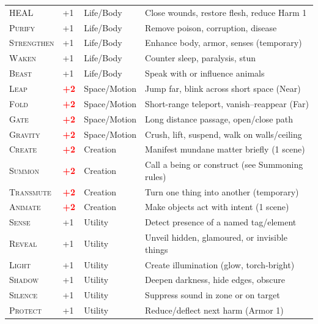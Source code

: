 \documentclass[10pt,a5paper]{book}
\newcommand{\dangerous}[1]{\textcolor{red}{\textbf{#1}}}
\newcommand{\tag}[1]{\textsc{#1}}
\begin{document}
\begin{longtable}{@{} p{2.5cm} p{1.2cm} p{2.5cm} p{6cm} @{}}
\tag{HEAL} & +1 & Life/Body & Close wounds, restore flesh, reduce Harm 1 \\
\tag{Purify} & +1 & Life/Body & Remove poison, corruption, disease \\
\tag{Strengthen} & +1 & Life/Body & Enhance body, armor, senses (temporary) \\
\tag{Waken} & +1 & Life/Body & Counter sleep, paralysis, stun \\
\tag{Beast} & +1 & Life/Body & Speak with or influence animals \\
\midrule

\tag{Leap} & \dangerous{+2} & Space/Motion & Jump far, blink across short space (Near) \\
\tag{Fold} & \dangerous{+2} & Space/Motion & Short-range teleport, vanish--reappear (Far) \\
\tag{Gate} & \dangerous{+2} & Space/Motion & Long distance passage, open/close path \\
\tag{Gravity} & \dangerous{+2} & Space/Motion & Crush, lift, suspend, walk on walls/ceiling \\
\midrule

\tag{Create} & \dangerous{+2} & Creation & Manifest mundane matter briefly (1 scene) \\
\tag{Summon} & \dangerous{+2} & Creation & Call a being or construct (see Summoning rules) \\
\tag{Transmute} & \dangerous{+2} & Creation & Turn one thing into another (temporary) \\
\tag{Animate} & \dangerous{+2} & Creation & Make objects act with intent (1 scene) \\
\midrule

\tag{Sense} & +1 & Utility & Detect presence of a named tag/element \\
\tag{Reveal} & +1 & Utility & Unveil hidden, glamoured, or invisible things \\
\tag{Light} & +1 & Utility & Create illumination (glow, torch‑bright) \\
\tag{Shadow} & +1 & Utility & Deepen darkness, hide edges, obscure \\
\tag{Silence} & +1 & Utility & Suppress sound in zone or on target \\
\tag{Protect} & +1 & Utility & Reduce/deflect next harm (Armor 1) \\
\midrule


\end{longtable}
\end{document}
